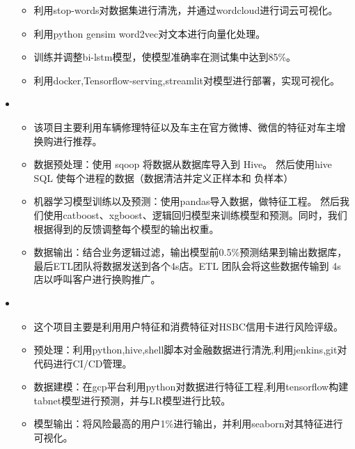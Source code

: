 \begin{itemize}[leftmargin=*]
{\begin{itemize}
       \item 利用stop-words对数据集进行清洗，并通过wordcloud进行词云可视化。
       \item 利用python gensim word2vec对文本进行向量化处理。
       \item 训练并调整bi-lstm模型，使模型准确率在测试集中达到85\%。
       \item 利用docker,Tensorflow-serving,streamlit对模型进行部署，实现可视化。
      \end{itemize}
      }
    \item
      {\small
      \begin{itemize}
       \item 该项目主要利用车辆修理特征以及车主在官方微博、微信的特征对车主增换购进行推荐。
       \item 数据预处理：使用 sqoop 将数据从数据库导入到 Hive。 然后使用hive SQL 使每个进程的数据（数据清洁并定义正样本和	      负样本）
       \item 机器学习模型训练以及预测：使用pandas导入数据，做特征工程。 然后我们使用catboost、xgboost、逻辑回归模型来训练模型和预测。同时，我们根据得到的反馈调整每个模型的输出权重。
       \item 数据输出：结合业务逻辑过滤，输出模型前0.5\%预测结果到输出数据库，最后ETL团队将数据发送到各个4s店。ETL 团队会将这些数据传输到 4s 店以呼叫客户进行换购推广。
      \end{itemize}
      }
    \item
      {\small
      \begin{itemize}
      
       \item 这个项目主要是利用用户特征和消费特征对HSBC信用卡进行风险评级。
       \item 预处理：利用python,hive,shell脚本对金融数据进行清洗,利用jenkins,git对代码进行CI/CD管理。
       \item 数据建模：在gcp平台利用python对数据进行特征工程,利用tensorflow构建tabnet模型进行预测，并与LR模型进行比较。
       \item 模型输出：将风险最高的用户1\%进行输出，并利用seaborn对其特征进行可视化。
      \end{itemize}
      }




  \end{itemize}


















